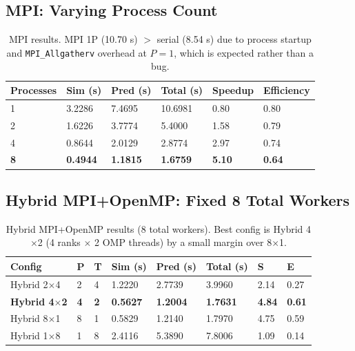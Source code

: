 \documentclass[11pt,a4paper]{article}
\newcommand{\code}[1]{\texttt{\small #1}}
\begin{document}
\subsection{MPI: Varying Process Count}

\begin{table}[!htbp]
\centering
\begin{tabular}{C{1.8cm} R{1.9cm} R{1.9cm} R{2.0cm} R{1.9cm} R{2.2cm}}
\toprule
\textbf{Processes} & \textbf{Sim (s)} & \textbf{Pred (s)} &
\textbf{Total (s)} & \textbf{Speedup} & \textbf{Efficiency} \\
 & 3.2286 & 7.4695 & 10.6981 & 0.80 & 0.80 \\
2 & 1.6226 & 3.7774 & 5.4000 & 1.58 & 0.79 \\
4 & 0.8644 & 2.0129 & 2.8774 & 2.97 & 0.74 \\
\textbf{8} & \textbf{0.4944} & \textbf{1.1815} & \textbf{1.6759} & \textbf{5.10} & \textbf{0.64} \\
\bottomrule
\end{tabular}
\caption{MPI results. MPI 1P (10.70 s) $>$ serial (8.54 s) due to process startup
and \code{MPI\_Allgatherv} overhead at $P=1$, which is expected rather than a bug.}
\end{table}

\subsection{Hybrid MPI+OpenMP: Fixed 8 Total Workers}

\begin{table}[!htbp]
\centering
\begin{tabular}{L{2.6cm} C{0.7cm} C{0.7cm} R{1.4cm} R{1.5cm} R{1.5cm} R{1.0cm} R{1.0cm}}
\toprule
\textbf{Config} & \textbf{P} & \textbf{T} &
\textbf{Sim (s)} & \textbf{Pred (s)} & \textbf{Total (s)} &
\textbf{S} & \textbf{E} \\
\midrule
Hybrid 2$\times$4 & 2 & 4 & 1.2220 & 2.7739 & 3.9960 & 2.14 & 0.27 \\
\textbf{Hybrid 4$\times$2} & \textbf{4} & \textbf{2} & \textbf{0.5627} & \textbf{1.2004} & \textbf{1.7631} & \textbf{4.84} & \textbf{0.61} \\
Hybrid 8$\times$1 & 8 & 1 & 0.5829 & 1.2140 & 1.7970 & 4.75 & 0.59 \\
Hybrid 1$\times$8 & 1 & 8 & 2.4116 & 5.3890 & 7.8006 & 1.09 & 0.14 \\
\bottomrule
\end{tabular}
\caption{Hybrid MPI+OpenMP results (8 total workers). Best config is Hybrid 4$\times$2 (4 ranks $\times$ 2 OMP threads) by a small margin over 8$\times$1.}
\end{table}
\end{document}
